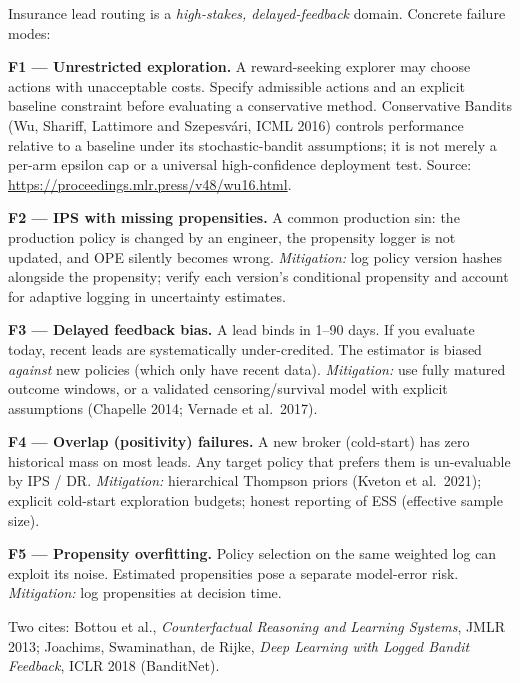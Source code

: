 \documentclass[11pt,oneside]{scrbook}
\begin{document}
\begin{safetyangle}
Insurance lead routing is a \emph{high-stakes, delayed-feedback} domain.
Concrete failure modes:

\textbf{F1 --- Unrestricted exploration.} A reward-seeking explorer may
choose actions with unacceptable costs. Specify admissible actions and
an explicit baseline constraint before evaluating a conservative method.
Conservative Bandits (Wu, Shariff, Lattimore and Szepesv\'ari, ICML 2016)
controls performance relative to a baseline under its stochastic-bandit
assumptions; it is not merely a per-arm epsilon cap or a universal
high-confidence deployment test. Source: \url{https://proceedings.mlr.press/v48/wu16.html}.



\textbf{F2 --- IPS with missing propensities.} A common production sin: the
production policy is changed by an engineer, the propensity logger is not
updated, and OPE silently becomes wrong. \emph{Mitigation:} log policy
version hashes alongside the propensity; verify each version's conditional propensity and account for adaptive
logging in uncertainty estimates.

\textbf{F3 --- Delayed feedback bias.} A lead binds in 1--90 days. If you
evaluate today, recent leads are systematically under-credited. The
estimator is biased \emph{against} new policies (which only have recent
data). \emph{Mitigation:} use fully matured outcome windows, or a validated censoring/survival
model with explicit assumptions (Chapelle 2014; Vernade et al.\ 2017).

\textbf{F4 --- Overlap (positivity) failures.} A new broker (cold-start)
has zero historical mass on most leads. Any target policy that prefers them
is un-evaluable by IPS / DR. \emph{Mitigation:} hierarchical Thompson
priors (Kveton et al.\ 2021); explicit cold-start exploration budgets;
honest reporting of ESS (effective sample size).

\textbf{F5 --- Propensity overfitting.} Policy selection on the same weighted log can exploit its noise.
Estimated propensities pose a separate model-error risk. \emph{Mitigation:} log
propensities at decision time.

Two cites: Bottou et al., \emph{Counterfactual Reasoning and Learning
Systems}, JMLR 2013; Joachims, Swaminathan, de Rijke, \emph{Deep Learning
with Logged Bandit Feedback}, ICLR 2018 (BanditNet).
\end{safetyangle}

\end{document}

